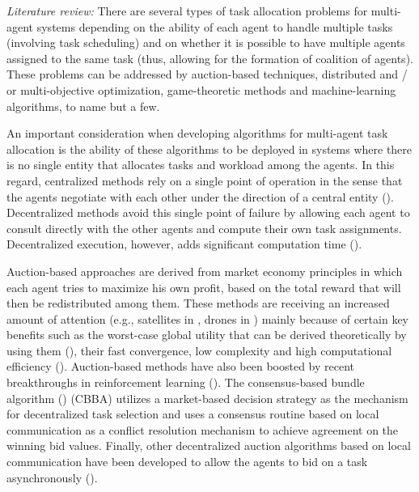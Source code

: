 \documentclass{ifacconf}
\begin{document}
\textit{Literature review:} There are several types of task allocation problems for multi-agent systems depending on the ability of each agent to handle multiple tasks (involving task scheduling) and on whether it is possible to have multiple agents assigned to the same task (thus, allowing for the formation of coalition of agents). These problems can be addressed by auction-based techniques, distributed and / or multi-objective optimization, game-theoretic methods and machine-learning algorithms, to name but a few.

An important consideration when developing algorithms for multi-agent task allocation is the ability of these algorithms to be deployed in systems where there is no single entity that allocates tasks and workload among the agents. In this regard, centralized methods rely on a single point of operation in the sense that the agents negotiate with each other under the direction of a central entity (\cite{p:gerkey2002}). 
Decentralized methods avoid this single point of failure by allowing each agent to consult directly with the other agents and compute their own task assignments. Decentralized execution, however, adds significant computation time (\cite{p:howauction2009,p:NANJANATH2010,p:capitan2013}). 

Auction-based approaches are derived from market economy principles in which each agent tries to maximize his own profit, based on the total reward that will then be redistributed among them. These methods are receiving an increased amount of attention (e.g., satellites in \cite{p:phillips2021}, drones in \cite{p:hayat2020}) mainly because of certain key benefits such as the worst-case global utility that can be derived theoretically by using them (\cite{p:guannan2019}), their fast convergence, low complexity and high computational efficiency (\cite{p:keum2019,p:shin2019}). Auction-based methods have also been boosted by recent breakthroughs in reinforcement learning (\cite{p:rahili2020}).
The consensus-based bundle algorithm (\cite{p:howauction2009}) (CBBA) utilizes a market-based decision strategy as the mechanism for decentralized task selection and uses a consensus routine based on local communication as a conflict resolution mechanism to achieve agreement on the winning bid values.
Finally, other decentralized auction algorithms based on local communication have been developed to allow the agents to bid on a task asynchronously (\cite{p:johnson2011}).
\end{document}
